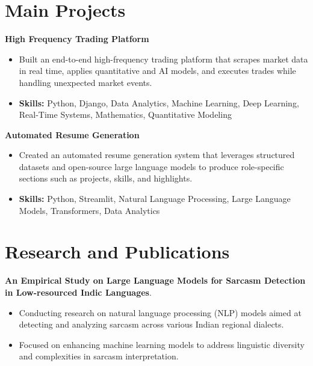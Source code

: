 \documentclass[a4paper,11pt]{article}
\begin{document}
\section{\textbf{Main Projects}}

\vspace{1mm}
  \textbf{High Frequency Trading Platform  }
\vspace{-1.5mm} %
\begin{itemize}
  \item Built an end-to-end high-frequency trading platform that scrapes market data in real time, applies quantitative and AI models, and executes trades while handling unexpected market events.
\vspace{-3mm}
  \item \textbf{Skills:} Python, Django, Data Analytics, Machine Learning, Deep Learning, Real-Time Systems, Mathematics, Quantitative Modeling
\end{itemize}


\vspace{1mm}
   \textbf{Automated Resume Generation }
\vspace{-1.5mm} %
\begin{itemize}
  \item Created an automated resume generation system that leverages structured datasets and open-source large language models to produce role-specific sections such as projects, skills, and highlights.
\vspace{-3mm}
  \item \textbf{Skills:} Python, Streamlit, Natural Language Processing, Large Language Models, Transformers, Data Analytics
\end{itemize}



\section{\textbf{Research and Publications} \hfill }
\vspace{1mm}
  \textbf{An Empirical Study on Large Language Models for Sarcasm Detection in Low-resourced Indic Languages}.
\vspace{-1mm} %
\begin{itemize}
  \item Conducting research on natural language processing (NLP) models aimed at detecting and analyzing sarcasm across various Indian regional dialects.
\vspace{-3mm}
  \item Focused on enhancing machine learning models to address linguistic diversity and complexities in sarcasm interpretation.
\end{itemize}
\end{document}
